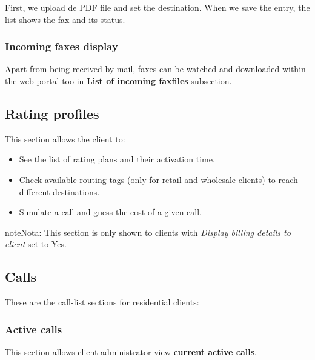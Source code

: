 \documentclass[letterpaper,10pt,spanish]{sphinxmanual}
\begin{document}
First, we upload de PDF file and set the destination. When we save the entry, the list shows the fax and its status.


\subsubsection{Incoming faxes display}
\label{administration_portal/client/residential/faxes:incoming-faxes-display}
Apart from being received by mail, faxes can be watched and downloaded within
the web portal too in \textbf{List of incoming faxfiles} subsection.


\subsection{Rating profiles}
\label{administration_portal/client/residential/rating_profiles:rating-profiles}\label{administration_portal/client/residential/rating_profiles::doc}
This section allows the client to:
\begin{itemize}
\item {} 
See the list of rating plans and their activation time.

\item {} 
Check available routing tags (only for retail and wholesale clients) to reach different destinations.

\item {} 
Simulate a call and guess the cost of a given call.

\end{itemize}

\begin{notice}{note}{Nota:}
This section is only shown to clients with \emph{Display billing details to client} set to Yes.
\end{notice}


\subsection{Calls}
\label{administration_portal/client/residential/calls/index::doc}\label{administration_portal/client/residential/calls/index:calls}
These are the call-list sections for residential clients:


\subsubsection{Active calls}
\label{administration_portal/client/residential/calls/active_calls::doc}\label{administration_portal/client/residential/calls/active_calls:active-calls}
This section allows client administrator view \textbf{current active calls}.
\end{document}
